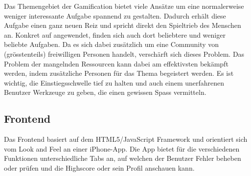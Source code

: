 Das Themengebiet der \gls{Gamification} bietet viele Ansätze um eine normalerweise weniger interessante Aufgabe spannend zu gestalten.
Dadurch erhält diese Aufgabe einen ganz neuen Reiz und spricht direkt den Spieltrieb des Menschen an.
Konkret auf  angewendet, finden sich auch dort beliebtere und weniger beliebte Aufgaben.
Da es sich dabei zusätzlich um eine Community von (grösstenteils) freiwilligen Personen handelt, verschärft sich dieses Problem.
Das Problem der mangelnden Ressourcen kann dabei am effektivsten bekämpft werden, indem zusätzliche Personen für das Thema begeistert werden.
Es ist wichtig, die Einstiegsschwelle tief zu halten und auch einem unerfahrenen Benutzer Werkzeuge zu geben, die einen gewissen Spass vermitteln.

\subsection*{Frontend}
Das Frontend basiert auf dem HTML5/JavaScript Framework  und orientiert sich vom Look and Feel an einer iPhone-App.
Die App bietet für die verschiedenen Funktionen unterschiedliche Tabs an, auf welchen der Benutzer Fehler beheben oder prüfen und die Highscore oder sein Profil anschauen kann.

